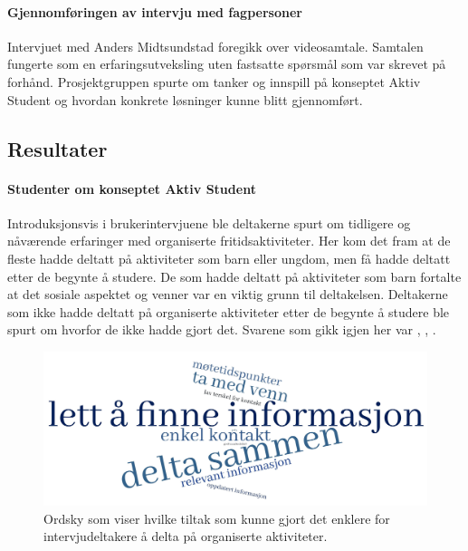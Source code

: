 \paragraph{Gjennomføringen av intervju med fagpersoner}
Intervjuet med Anders Midtsundstad foregikk over videosamtale. Samtalen fungerte som en erfaringsutveksling uten fastsatte spørsmål som var skrevet på forhånd. Prosjektgruppen spurte om tanker og innspill på konseptet Aktiv Student og hvordan konkrete løsninger kunne blitt gjennomført.


\subsection{Resultater}

\paragraph{Studenter om konseptet Aktiv Student}
Introduksjonsvis i brukerintervjuene ble deltakerne spurt om tidligere og nåværende erfaringer med organiserte fritidsaktiviteter. Her kom det fram at de fleste hadde deltatt på aktiviteter som barn eller ungdom, men få hadde deltatt etter de begynte å studere. De som hadde deltatt på aktiviteter som barn fortalte at det sosiale aspektet og venner var en viktig grunn til deltakelsen. Deltakerne som ikke hadde deltatt på organiserte aktiviteter etter de begynte å studere ble spurt om hvorfor de ikke hadde gjort det. Svarene som gikk igjen her var , , .

\begin{figure}[H]
\includegraphics[width=\textwidth]{Illustrasjoner/ordsky-tiltak.jpg}
\caption{Ordsky som viser hvilke tiltak som kunne gjort det enklere for intervjudeltakere å delta på organiserte aktiviteter.}
\label{fig:ordsky-tiltak}
\end{figure}


